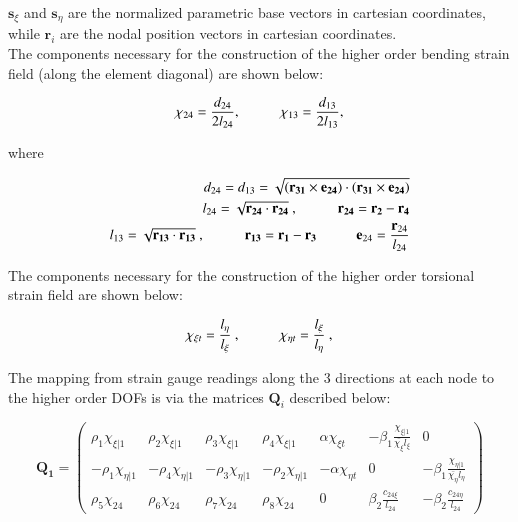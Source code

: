$\textbf{s}_\xi$ and $\textbf{s}_\eta$ are the normalized parametric base vectors in cartesian coordinates, while $\textbf{r}_i$ are the nodal position vectors in cartesian coordinates.\\

The components necessary for the construction of the higher order bending strain field (along the element diagonal) are shown below: 


\begin{equation} 
\chi_{24} = \frac{d_{24}}{2 l_{24}},
\hspace{10mm}
\chi_{13} = \frac{d_{13}}{2 l_{13}},
\label{equation12chi24}
\end{equation}

where

\begin{align*} 
	d_{24} = d_{13} = \sqrt{(\mathbf{r_{31}} \times \mathbf{e_{24}}) \cdot (\mathbf{r_{31}} \times \mathbf{e_{24}})} \\
	l_{24} = \sqrt{\mathbf{r_{24}} \cdot \mathbf{r_{24}}}\ ,
	\hspace{10mm}
	\mathbf{r_{24}} = \mathbf{r_2} - \mathbf{r_4} \\
	l_{13} = \sqrt{\mathbf{r_{13}} \cdot \mathbf{r_{13}}}\ ,
	\hspace{10mm}
	\mathbf{r_{13}} = \mathbf{r_1} - \mathbf{r_3}
	\hspace{10mm}
	\mathbf{e}_{24} = \frac{\mathbf{r}_{24}}{l_{24}}
\end{align*}

The components necessary for the construction of the higher order torsional strain field are shown below:

\begin{equation} 
\chi_{\xi t} = \frac{l_\eta}{l_\xi}\ ,
\hspace{10mm}
\chi_{\eta t} = \frac{l_\xi}{l_\eta}\ ,
\label{equation13}
\end{equation}


The mapping from strain gauge readings along the 3 directions at each node to the higher order DOFs is via the matrices $\mathbf{Q}_i$ described below:


\begin{equation} 
\mathbf{Q_1} =
\begin{pmatrix}
\rho_1 \chi_{\xi | 1} & \rho_2 \chi_{\xi | 1} & \rho_3 \chi_{\xi | 1} & \rho_4 \chi_{\xi | 1} & \alpha \chi_{\xi t} & -\beta_1 \frac{\chi_{\xi | 1}}{\bar{\chi_\xi} l_\xi} & 0  \\	
-\rho_1 \chi_{\eta | 1} & -\rho_4 \chi_{\eta | 1} & -\rho_3 \chi_{\eta | 1} & -\rho_2 \chi_{\eta | 1} & -\alpha \chi_{\eta t} & 0 & -\beta_1 \frac{\chi_{\eta | 1}}{\bar{\chi_\eta} l_\eta} \\
\rho_5 \chi_{24} & \rho_6 \chi_{24} & \rho_7 \chi_{24} & \rho_8 \chi_{24} & 0 & \beta_2 \frac{c_{24 \xi}}{l_{24}} & -\beta_2 \frac{c_{24 \eta}}{l_{24}}
\end{pmatrix}		
\label{equation14}
\end{equation}

